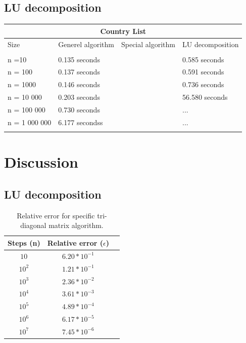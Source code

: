 \documentclass[norsk,a4paper,12pt]{article}
\begin{document}
  \subsection{LU decomposition}
 \begin{tabular}{ |p{4cm}||p{4cm}|p{4cm}|p{4cm}|  }
 \hline
 \multicolumn{4}{|c|}{Country List} \\
 \hline
Size & Generel algorithm& Special algorithm& LU decomposition \\ \\
 \hline
 n =10 & 0.135 seconds & &0.585 seconds\\
n = 100 & 0.137 seconds   &  & 0.591 seconds\\
n = 1000 &0.146 seconds &  & 0.736 seconds\\
n = 10 000    &0.203 seconds&  &56.580 seconds\\
n = 100 000& 0.730 seconds & & ...\\
n = 1 000 000 & 6.177 secondss &    &...\\
 &  &  &\\
 \hline
\end{tabular}

  \section{Discussion}
    \subsection{LU decomposition}

 \begin{table}[h!]
\begin{center}
\caption{Relative error for specific tri-diagonal matrix algorithm.}
\begin{tabular}{ |c|c|c| } \hline
Steps (n)&Relative error ($\epsilon$) \\ \hline
$10$&$6.20*10^{-1}$ \\ \hline
$10^2$&$1.21*10^{-1}$ \\ \hline
$10^3$&$2.36*10^{-2}$ \\ \hline
$10^4$&$3.61*10^{-3}$ \\ \hline
$10^5$&$4.89*10^{-4}$ \\ \hline
$10^6$&$6.17*10^{-5}$ \\ \hline
$10^7$&$7.45*10^{-6}$ \\ \hline
\end{tabular}
\label{tab:e}
\end{center}
\end{table}
 
\end{document}
